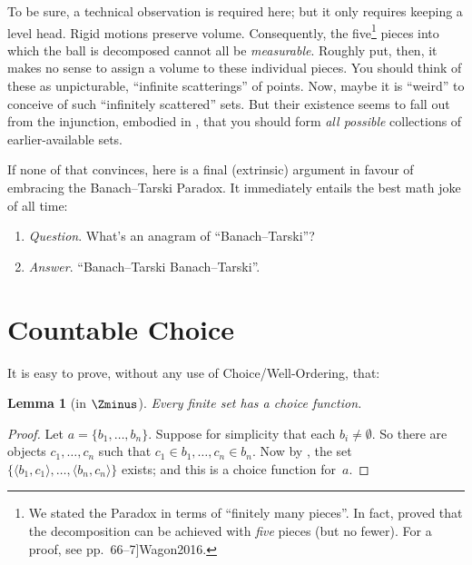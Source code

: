 \documentclass[10pt,a4paper]{article}
\makeatletter
\theoremstyle{plain}
\newtheorem{lem}[thm]{Lemma}
\theoremstyle{definition}
\theoremstyle{remark}
\newcommand*{\olfileid}[3]{}
\newcommand*{\olsection}[1]{\section*{#1}}
\newcommand*{\olchapter}[3]{}
\newcommand*{\olimport}[1]{}
\newcommand{\olref}{\@ifnextchar[{\olref@i}{\olref@final}}
\def\olref@i[#1]{\@ifnextchar[{\olref@ii}{\olref@final}}
\def\olref@ii[#1]{\@ifnextchar[{\olref@iii}{\olref@final}}
\def\olref@iii[#1]{\olref@final}
\def\olref@final#1{\ref{#1}}
\providecommand{\citet}[1]{\cite{#1}}
\makeatother
\begin{document}
To be sure, a technical observation is required here; but it only
requires keeping a level head. Rigid motions preserve volume.
Consequently, the five\footnote{We stated the Paradox in terms of
``finitely many pieces''. In fact, \citet{Robinson1947} proved that
the decomposition can be achieved with \emph{five} pieces
(but no fewer). For a proof, see \citet[pp.~66--7]{Wagon2016}.} pieces
into which the ball is decomposed cannot all be \emph{measurable}.
Roughly put, then, it makes no sense to assign a volume to these
individual pieces. You should think of these as unpicturable,
``infinite scatterings'' of points. Now, maybe it is ``weird'' to
conceive of such ``infinitely scattered'' sets. But their existence
seems to fall out from the injunction, embodied in \stagesacc{}, that
you should form \emph{all possible} collections of earlier-available
sets. 

If none of that convinces, here is a final (extrinsic) argument in
favour of embracing the Banach--Tarski Paradox. It immediately entails
the best math joke of all time:
\begin{enumerate}
	\item[] \emph{Question}. What's an anagram of ``Banach--Tarski''? 
	\item[] \emph{Answer}. ``Banach--Tarski Banach--Tarski''.
\end{enumerate}




\olchapter{sth}{choice}{Choice}

\olimport{introduction}
\olimport{tarskiscott}
\olimport{hartogs}
\olimport{wellorderingproblem}
\olimport{countablechoice}
\olimport{justifications}
\olimport{banach}
\olimport{vitali}

\OLEndChapterHook



\olfileid{sth}{choice}{countablechoice}
\olsection{Countable Choice}

It is easy to prove, without any use of Choice/Well-Ordering, that:

\begin{lem}[in $\Zminus$]
Every finite set has a choice function. 
\end{lem}

\begin{proof}
Let $a = \{b_1, \ldots, b_n\}$. Suppose for simplicity that each $b_i
\neq \emptyset$. So there are objects $c_1, \ldots, c_n$ such that
$c_1 \in b_1, \ldots, c_n \in b_n$. Now by
\olref[z][pairs]{prop:pairsconsequences}, the set $\{\langle b_1,
c_1\rangle , \ldots, \langle b_n, c_n\rangle\}$ exists; and this is a
choice function for~$a$.
\end{proof}
\end{document}
